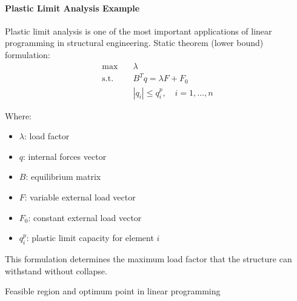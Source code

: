 \paragraph{Plastic Limit Analysis Example}
Plastic limit analysis is one of the most important applications of linear programming in structural engineering. Static theorem (lower bound) formulation:
\begin{equation}
\begin{aligned}
\max & \quad \lambda \\
\text{s.t.} & \quad B^T q = \lambda F + F_0 \\
& \quad |q_i| \leq q_i^p, \quad i = 1, \ldots, n
\end{aligned}
\end{equation}

Where:
\begin{itemize}
    \item $\lambda$: load factor
    \item $q$: internal forces vector
    \item $B$: equilibrium matrix
    \item $F$: variable external load vector
    \item $F_0$: constant external load vector
    \item $q_i^p$: plastic limit capacity for element $i$
\end{itemize}

This formulation determines the maximum load factor that the structure can withstand without collapse.


\begin{marginfigure}
\centering
{}
\caption{Feasible region and optimum point in linear programming}
\label{fig:linear_programming}
\end{marginfigure}

